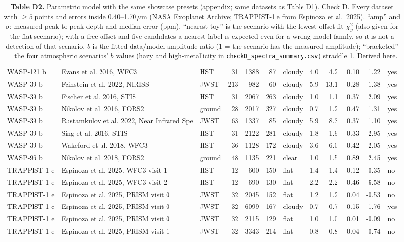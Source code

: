 \begin{table}[H]
\begin{tabular}{@{}lllrrrlrrrrl@{}}
WASP-121 b & Evans et al. 2016, WFC3 & HST & 31 & 1388 & 87 & cloudy & 4.0 & 4.2 & 0.10 & 1.22 & yes \\
WASP-39 b & Feinstein et al. 2022, NIRISS & JWST & 213 & 982 & 60 & cloudy & 5.9 & 13.1 & 0.28 & 1.38 & yes \\
WASP-39 b & Fischer et al. 2016, STIS & HST & 31 & 2067 & 263 & cloudy & 1.0 & 1.1 & 0.37 & 2.09 & yes \\
WASP-39 b & Nikolov et al. 2016, FORS2 & ground & 28 & 2017 & 327 & cloudy & 0.7 & 1.2 & 0.47 & 1.31 & yes \\
WASP-39 b & Rustamkulov et al. 2022, Near Infrared Spe & JWST & 63 & 1337 & 85 & cloudy & 5.9 & 8.3 & 0.37 & 1.10 & yes \\
WASP-39 b & Sing et al. 2016, STIS & HST & 31 & 2122 & 281 & cloudy & 1.8 & 1.9 & 0.33 & 2.95 & yes \\
WASP-39 b & Wakeford et al. 2018, WFC3 & HST & 36 & 1128 & 172 & cloudy & 3.6 & 6.0 & 0.42 & 2.05 & yes \\
WASP-96 b & Nikolov et al. 2018, FORS2 & ground & 48 & 1135 & 221 & clear & 1.0 & 1.5 & 0.89 & 2.45 & yes \\
TRAPPIST-1 e & Espinoza et al. 2025, WFC3 visit 1 & HST & 12 & 600 & 150 & flat & 1.4 & 1.4 & -0.12 & 0.35 & no \\
TRAPPIST-1 e & Espinoza et al. 2025, WFC3 visit 2 & HST & 12 & 690 & 130 & flat & 2.2 & 2.2 & -0.46 & -6.58 & no \\
TRAPPIST-1 e & Espinoza et al. 2025, PRISM visit 0 & JWST & 32 & 2045 & 152 & flat & 1.2 & 1.2 & 0.04 & -0.53 & no \\
TRAPPIST-1 e & Espinoza et al. 2025, PRISM visit 0 & JWST & 32 & 6099 & 167 & cloudy & 0.7 & 0.7 & 0.15 & 1.76 & yes \\
TRAPPIST-1 e & Espinoza et al. 2025, PRISM visit 0 & JWST & 32 & 2115 & 129 & flat & 1.0 & 1.0 & 0.01 & -0.09 & no \\
TRAPPIST-1 e & Espinoza et al. 2025, PRISM visit 1 & JWST & 32 & 3343 & 214 & flat & 0.8 & 0.8 & -0.04 & -0.74 & no \\
\bottomrule
\end{tabular}
\caption*{\footnotesize\textbf{Table D2.} Parametric model with the same showcase presets (appendix; same datasets as Table D1). Check D. Every dataset with $\ge 5$ points and errors inside 0.40--1.70\,$\mu$m (NASA Exoplanet Archive; TRAPPIST-1\,e from Espinoza et al.\ 2025). ``amp'' and $\sigma$: measured peak-to-peak depth and median error (ppm). ``nearest toy'' is the scenario with the lowest offset-fit $\chi^2_\nu$ (also given for the flat scenario); with a free offset and five candidates a nearest label is expected even for a wrong model family, so it is not a detection of that scenario. $b$ is the fitted data/model amplitude ratio (1 = the scenario has the measured amplitude); ``bracketed'' = the four atmospheric scenarios' $b$ values (hazy and high-metallicity in \texttt{checkD\_spectra\_summary.csv}) straddle 1. Derived here.}
\end{table}
